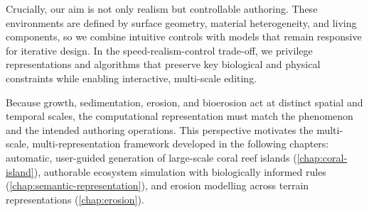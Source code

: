 Crucially, our aim is not only realism but controllable authoring. These environments are defined by surface geometry, material heterogeneity, and living components, so we combine intuitive controls with models that remain responsive for iterative design. In the speed-realism-control trade-off, we privilege representations and algorithms that preserve key biological and physical constraints while enabling interactive, multi-scale editing.

Because growth, sedimentation, erosion, and bioerosion act at distinct spatial and temporal scales, the computational representation must match the phenomenon and the intended authoring operations. This perspective motivates the multi-scale, multi-representation framework developed in the following chapters: automatic, user-guided generation of large-scale coral reef islands (\cref{chap:coral-island}), authorable ecosystem simulation with biologically informed rules (\cref{chap:semantic-representation}), and erosion modelling across terrain representations (\cref{chap:erosion}).




